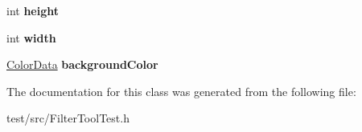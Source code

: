 \begin{DoxyCompactItemize}
\item 
\hypertarget{classFilterToolTest_a884222e7a8b6b990bf84793e212a9df9}{int {\bfseries height}}\label{classFilterToolTest_a884222e7a8b6b990bf84793e212a9df9}

\item 
\hypertarget{classFilterToolTest_abf9277c4c4257ed1499f304532d039a0}{int {\bfseries width}}\label{classFilterToolTest_abf9277c4c4257ed1499f304532d039a0}

\item 
\hypertarget{classFilterToolTest_a849cbf0cc7c5643cf6d1d4ed7cc8c700}{\hyperlink{classColorData}{Color\-Data} {\bfseries background\-Color}}\label{classFilterToolTest_a849cbf0cc7c5643cf6d1d4ed7cc8c700}

\end{DoxyCompactItemize}


The documentation for this class was generated from the following file\-:\begin{DoxyCompactItemize}
\item 
test/src/Filter\-Tool\-Test.\-h\end{DoxyCompactItemize}
